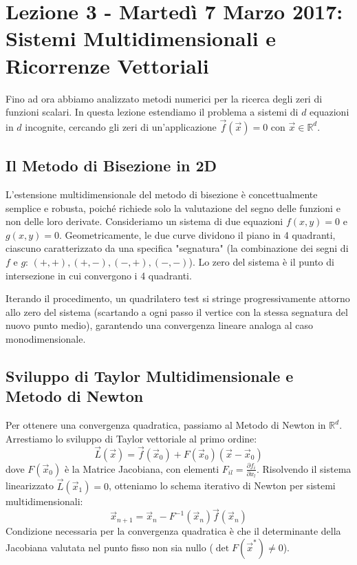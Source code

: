 \documentclass[12pt,a4paper]{article}
\begin{document}
\newpage
\section{Lezione 3 - Martedì 7 Marzo 2017: Sistemi Multidimensionali e Ricorrenze Vettoriali}

Fino ad ora abbiamo analizzato metodi numerici per la ricerca degli zeri di funzioni scalari. In questa lezione estendiamo il problema a sistemi di $d$ equazioni in $d$ incognite, cercando gli zeri di un'applicazione $\vec{f}(\vec{x}) = 0$ con $\vec{x} \in \mathbb{R}^d$.

\subsection{Il Metodo di Bisezione in 2D}
L'estensione multidimensionale del metodo di bisezione è concettualmente semplice e robusta, poiché richiede solo la valutazione del segno delle funzioni e non delle loro derivate. Consideriamo un sistema di due equazioni $f(x, y) = 0$ e $g(x, y) = 0$. Geometricamente, le due curve dividono il piano in 4 quadranti, ciascuno caratterizzato da una specifica "segnatura" (la combinazione dei segni di $f$ e $g$: $(+,+), (+,-), (-,+), (-,-)$). Lo zero del sistema è il punto di intersezione in cui convergono i 4 quadranti.

Iterando il procedimento, un quadrilatero test si stringe progressivamente attorno allo zero del sistema (scartando a ogni passo il vertice con la stessa segnatura del nuovo punto medio), garantendo una convergenza lineare analoga al caso monodimensionale.

\subsection{Sviluppo di Taylor Multidimensionale e Metodo di Newton}
Per ottenere una convergenza quadratica, passiamo al Metodo di Newton in $\mathbb{R}^d$. Arrestiamo lo sviluppo di Taylor vettoriale al primo ordine:
\begin{equation}
\vec{L}(\vec{x}) = \vec{f}(\vec{x}_0) + F(\vec{x}_0)(\vec{x} - \vec{x}_0)
\end{equation}
dove $F(\vec{x}_0)$ è la Matrice Jacobiana, con elementi $F_{il} = \frac{\partial f_i}{\partial x_l}$. Risolvendo il sistema linearizzato $\vec{L}(\vec{x}_1) = 0$, otteniamo lo schema iterativo di Newton per sistemi multidimensionali:
\begin{equation}
\vec{x}_{n+1} = \vec{x}_n - F^{-1}(\vec{x}_n)\vec{f}(\vec{x}_n)
\end{equation}
Condizione necessaria per la convergenza quadratica è che il determinante della Jacobiana valutata nel punto fisso non sia nullo ($\det F(\vec{x}^*) \neq 0$).
\end{document}
